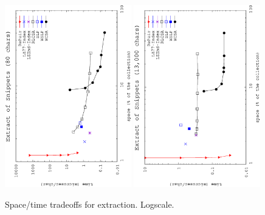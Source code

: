 \documentclass[review]{elsarticle}
\begin{document}
\begin{figure}[t]
\begin{center}
\includegraphics[angle=-90,width=0.49\textwidth]{../figures/f5/length80/extract80.eps}
\includegraphics[angle=-90,width=0.49\textwidth]{../figures/f5/length13000/extract13000.eps}
\caption{Space/time tradeoffs for extraction. Logscale.}
\label{fig:extract}
\end{center}
\end{figure}
\end{document}
